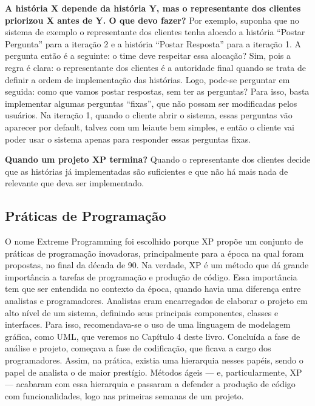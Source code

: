 \documentclass[
  11pt,
  twoside]{book}
\begin{document}
\textbf{A história X depende da história Y, mas o representante dos
clientes priorizou X antes de Y. O que devo fazer?} Por exemplo, suponha
que no sistema de exemplo o representante dos clientes tenha alocado a
história ``Postar Pergunta'' para a iteração 2 e a história ``Postar
Resposta'' para a iteração 1. A pergunta então é a seguinte: o time deve
respeitar essa alocação? Sim, pois a regra é clara: o representante dos
clientes é a autoridade final quando se trata de definir a ordem de
implementação das histórias. Logo, pode-se perguntar em seguida: como
que vamos postar respostas, sem ter as perguntas? Para isso, basta
implementar algumas perguntas ``fixas'', que não possam ser modificadas
pelos usuários. Na iteração 1, quando o cliente abrir o sistema, essas
perguntas vão aparecer por default, talvez com um leiaute bem simples, e
então o cliente vai poder usar o sistema apenas para responder essas
perguntas fixas.

\textbf{Quando um projeto XP termina?} Quando o representante dos
clientes decide que as histórias já implementadas são suficientes e que
não há mais nada de relevante que deva ser implementado.

\hypertarget{pruxe1ticas-de-programauxe7uxe3o}{%
\subsection{Práticas de
Programação}\label{pruxe1ticas-de-programauxe7uxe3o}}

O nome Extreme Programming foi escolhido porque XP propõe um conjunto de
práticas de programação inovadoras, principalmente para a época na qual
foram propostas, no final da década de 90. Na verdade, XP é um método
que dá grande importância a tarefas de programação e produção de código.
Essa importância tem que ser entendida no contexto da época, quando
havia uma diferença entre analistas e programadores. Analistas eram
encarregados de elaborar o projeto em alto nível de um sistema,
definindo seus principais componentes, classes e interfaces. Para isso,
recomendava-se o uso de uma linguagem de modelagem gráfica, como UML,
que veremos no Capítulo 4 deste livro. Concluída a fase de análise e
projeto, começava a fase de codificação, que ficava a cargo dos
programadores. Assim, na prática, existia uma hierarquia nesses papéis,
sendo o papel de analista o de maior prestígio. Métodos ágeis --- e,
particularmente, XP --- acabaram com essa hierarquia e passaram a
defender a produção de código com funcionalidades, logo nas primeiras
semanas de um projeto.
\end{document}
